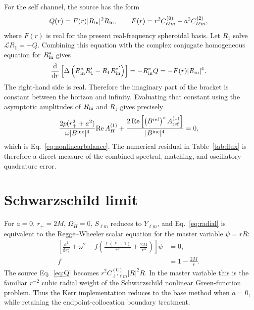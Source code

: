 \documentclass[aps,prd,twocolumn,nofootinbib,superscriptaddress,10pt,floatfix]{revtex4-2}
\newcommand{\dd}{\mathrm{d}}
\newcommand{\rp}{r_+}
\newcommand{\OmH}{\Omega_H}
\newcommand{\Bin}{B^{\rm inc}}
\newcommand{\Bref}{B^{\rm ref}}
\newcommand{\Aref}{A_{\rm ref}^{(1)}}
\newcommand{\AH}{A_H^{(1)}}
\begin{document}
For the self channel, the source has the form
\begin{equation}
Q(r)=F(r)|R_{\rm in}|^2R_{\rm in},
\qquad
F(r)=r^2C^{(0)}_{\ell\ell m}+a^2C^{(2)}_{\ell\ell m},
\end{equation}
where $F(r)$ is real for the present real-frequency spheroidal basis.  Let
$R_1$ solve $\mathcal{L}R_1=-Q$.  Combining this equation with the complex
conjugate homogeneous equation for $R_{\rm in}^*$ gives
\begin{equation}
\frac{\dd}{\dd r}
\left[
\Delta\left(
R_{\rm in}^*R_1'-R_1R_{\rm in}^{*'}
\right)
\right]
=
-R_{\rm in}^*Q
=
-F(r)|R_{\rm in}|^4 .
\end{equation}
The right-hand side is real.  Therefore the imaginary part of the bracket is
constant between the horizon and infinity.  Evaluating that constant using the
asymptotic amplitudes of $R_{\rm in}$ and $R_1$ gives precisely
\begin{equation}
\frac{2p(\rp^2+a^2)}{\omega|\Bin|^4}\mathrm{Re}\,\AH
+
\frac{2\,\mathrm{Re}\left[\left(\Bref\right)^*\Aref\right]}{|\Bin|^4}
=0,
\end{equation}
which is Eq.~\eqref{eq:nonlinearbalance}.  The numerical residual in
Table~\ref{tab:flux} is therefore a direct measure of the combined spectral,
matching, and oscillatory-quadrature error.

\section{Schwarzschild limit}

For $a=0$, $\rp=2M$, $\OmH=0$, $S_{\ell m}$ reduces to $Y_{\ell m}$, and
Eq.~\eqref{eq:radial} is equivalent to the Regge--Wheeler scalar equation for
the master variable $\psi=rR$:
\begin{equation}
\begin{aligned}
\left[
\frac{\dd^2}{\dd r_*^2}
+\omega^2
-f\left(\frac{\ell(\ell+1)}{r^2}+\frac{2M}{r^3}\right)
\right]\psi&=0,\\
f&=1-\frac{2M}{r}.
\end{aligned}
\end{equation}
The source Eq.~\eqref{eq:Q} becomes
$r^2C^{(0)}_{\ell'\ell m}|R|^2R$.  In the master variable this is the familiar
$r^{-2}$ cubic radial weight of the Schwarzschild nonlinear Green-function
problem.  Thus the Kerr implementation reduces to the base method when
$a=0$, while retaining the endpoint-collocation boundary treatment.
\end{document}
